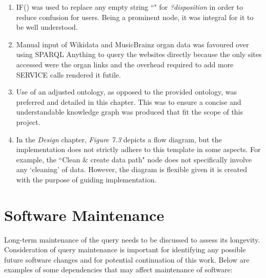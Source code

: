 \begin{enumerate}
    \item IF() was used to replace any empty string ``" for \textit{?disposition} in order to reduce confusion for users. Being a prominent node, it was integral for it to be well understood. 
    \item Manual input of Wikidata and MusicBrainz organ data was favoured over using SPARQL Anything to query the websites directly because the only sites accessed were the organ links and the overhead required to add more SERVICE calls rendered it futile. 
    \item Use of an adjusted ontology, as opposed to the provided ontology, was preferred and detailed in this chapter. This was to ensure a concise and understandable knowledge graph was produced that fit the scope of this project. 
    \item In the \textit{Design} chapter, \textit{Figure 7.3} depicts a flow diagram, but the implementation does not strictly adhere to this template in some aspects. For example, the ``Clean \& create data path" node does not specifically involve any `cleaning' of data. However, the diagram is flexible given it is created with the purpose of guiding implementation. 
\end{enumerate}

\section{Software Maintenance}
\hspace{0.5cm} Long-term maintenance of the query needs to be discussed to assess its longevity. Consideration of query maintenance is important for identifying any possible future software changes and for potential continuation of this work. Below are examples of some dependencies that may affect maintenance of software:  


